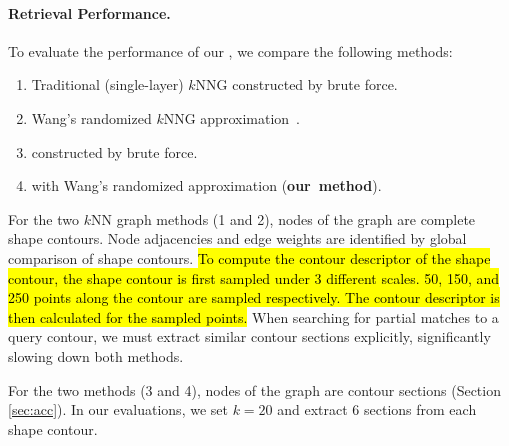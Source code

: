 \paragraph*{{\RCKNNG} Retrieval Performance.} To evaluate the performance of our {\RCKNNG}, we compare the following methods:
\begin{enumerate}
\setlength{\itemsep}{3pt}
\setlength{\parskip}{0pt}
\setlength{\parsep}{0pt}
\item Traditional (single-layer) $k$NNG constructed by brute force.
\item Wang's randomized $k$NNG approximation~\cite{scalableknnjingwangcvpr2012}.
\item {\RCKNNG} constructed by brute force.
\item {\RCKNNG} with Wang's randomized approximation (\mbox{\textbf{our method}}).
\end{enumerate}
For the two $k$NN graph methods (1 and 2), nodes of the graph are complete shape contours. Node adjacencies and edge weights are identified by global comparison of shape contours. \hl{To compute the contour descriptor of the shape contour, the shape contour is first sampled under 3 different scales. 50, 150, and 250 points along the contour are sampled respectively. The contour descriptor is then calculated for the sampled points.} When searching for partial matches to a query contour, we must extract similar contour sections explicitly, significantly slowing down both methods.

For the two {\RCKNNG} methods (3 and 4), nodes of the graph are contour sections (Section \ref{sec:acc}). In our evaluations, we set $k = 20$  and extract $6$ sections from each shape contour.

